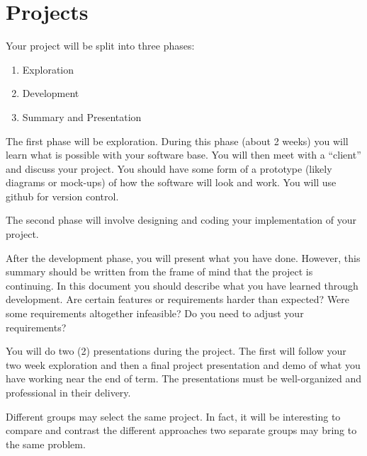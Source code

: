 \documentclass[letterpaper]{article}
\begin{document}
\section{Projects}

Your project will be split into three phases:

\begin{enumerate}
\item Exploration 
\item Development
\item Summary and Presentation
\end{enumerate}

The first phase will be exploration.  During this phase (about 2
weeks) you will learn what is possible with your software base.  You will then
meet with a ``client'' and discuss your project.   You should have some form
of a prototype (likely diagrams or mock-ups) of how the software will look and
work.  You will use github for version control.  

The second phase will involve designing and coding your implementation of your
project.  

After the development phase, you will present what you have done.  However,
this summary should be written from the frame of mind that the project is
continuing.  In this document you should describe what you have learned through
development.  Are certain features or requirements harder
than expected?  Were some requirements altogether infeasible?  Do you need to
adjust your requirements?

You will do two (2) presentations during the project.  The first will follow
your two week exploration and then a final project
presentation and demo of what you have working near the end of term.  The
presentations must be well-organized and professional in their delivery.

Different groups may select the same project.  In fact, it will be interesting
to compare and contrast the different approaches two separate groups may bring
to the same problem.
\end{document}

